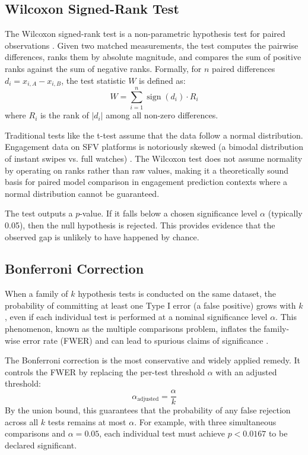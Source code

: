 \subsection{Wilcoxon Signed-Rank Test}

The Wilcoxon signed-rank test is a non-parametric hypothesis test for paired observations \cite{wilcoxon1945individual}. Given two matched measurements, the test computes the pairwise differences, ranks them by absolute magnitude, and compares the sum of positive ranks against the sum of negative ranks. Formally, for $n$ paired differences $d_i=x_{i,A} - x_{i,B}$, the test statistic $W$ is defined as:
$$W = \sum_{i=1}^{n} \operatorname{sign}(d_i) \cdot R_i$$
where $R_i$ is the rank of $|d_i|$ among all non-zero differences.

Traditional tests like the t-test assume that the data follow a normal distribution. Engagement data on SFV platforms is notoriously skewed (a bimodal distribution of instant swipes vs. full watches) \cite{sun2025engagement}. The Wilcoxon test does not assume normality by operating on ranks rather than raw values, making it a theoretically sound basis for paired model comparison in engagement prediction contexts where a normal distribution cannot be guaranteed.

The test outputs a $p$-value. If it falls below a chosen significance level $\alpha$ (typically 0.05), then the null hypothesis is rejected. This provides evidence that the observed gap is unlikely to have happened by chance.

\subsection{Bonferroni Correction}

When a family of $k$ hypothesis tests is conducted on the same dataset, the probability of committing at least one Type I error (a false positive) grows with $k$, even if each individual test is performed at a nominal significance level $\alpha$. This phenomenon, known as the multiple comparisons problem, inflates the family-wise error rate (FWER) and can lead to spurious claims of significance \cite{dunn1961multiple}.

The Bonferroni correction is the most conservative and widely applied remedy. It controls the FWER by replacing the per-test threshold $\alpha$ with an adjusted threshold:
$$\alpha_{\text{adjusted}} = \frac{\alpha}{k}$$
By the union bound, this guarantees that the probability of any false rejection across all $k$ tests remains at most $\alpha$. For example, with three simultaneous comparisons and $\alpha = 0.05$, each individual test must achieve $p < 0.0167$ to be declared significant.

